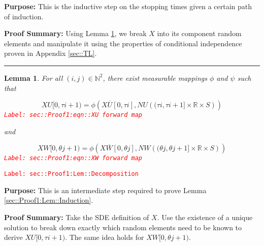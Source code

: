 \documentclass[12pt]{article}
\newcommand{\mb}{\mathbb}
\newcommand{\ov}{\overline}
\newcommand{\tr}{\textcolor{red}}
\newcommand{\labe}[1]{\tr{\texttt{Label: #1}}}
\newcommand{\purpose}{\textbf{Purpose: }}
\newcommand{\pfsum}{\textbf{Proof Summary: }}
\newcommand{\lin}{\rule{\linewidth}{0.4 pt}}
\renewcommand{\U}{U}							%
\newcommand{\UU}{W}								%
\renewcommand{\S}{S}							%
\newcommand{\X}{X}								%
\newcommand{\cl}{\ov}							%
\newcommand{\poiss}{N}							%
\newcommand{\rt}{\tau}							%
\newcommand{\rtt}{\theta}						%
\newtheorem{lem}[thms]{Lemma}
\begin{document}
\purpose This is the inductive step on the stopping times given a certain path of induction.

\pfsum Using Lemma \ref{sec::Proof1:Lem::Decomposition}, we break \(\X{}{}\) into its component random elements and manipulate it using the properties of conditional independence proven in Appendix \ref{sec::TL}.

\lin

\begin{lem}
For all \((i,j)\in \mb{N}^2\), there exist measurable mappings \(\phi\) and \(\psi\) such that 

\begin{equation}
\X{\U}{[0,\rt{i+1})} = \phi\left(\X{\cl{\U}}{[0,\rt{i}]}, \poiss{\U}\left((\rt{i}, \rt{i+1}]\times \mb{R}\times \S\right)\right)
\label{sec::Proof1:eqn::XU forward map}
\end{equation}
\labe{sec::Proof1:eqn::XU forward map}

and

\begin{equation}
\X{\UU}{[0,\rtt{j+1})} = \phi\left(\X{\cl{\UU}}{[0,\rtt{j}]}, \poiss{\UU}\left((\rtt{j}, \rtt{j+1}]\times \mb{R}\times \S\right)\right)
\label{sec::Proof1:eqn::XW forward map}
\end{equation}
\labe{sec::Proof1:eqn::XW forward map}

\label{sec::Proof1:Lem::Decomposition}
\end{lem}
\labe{sec::Proof1:Lem::Decomposition}

\purpose This is an intermediate step required to prove Lemma \ref{sec::Proof1:Lem::Induction}.

\pfsum Take the SDE definition of \(\X{}{}\). Use the existence of a unique solution to break down exactly which random elements need to be known to derive \(\X{\U}{[0,\rt{i+1})}\). The same idea holds for \(\X{\UU}{[0,\rtt{j+1})}\).
\end{document}
